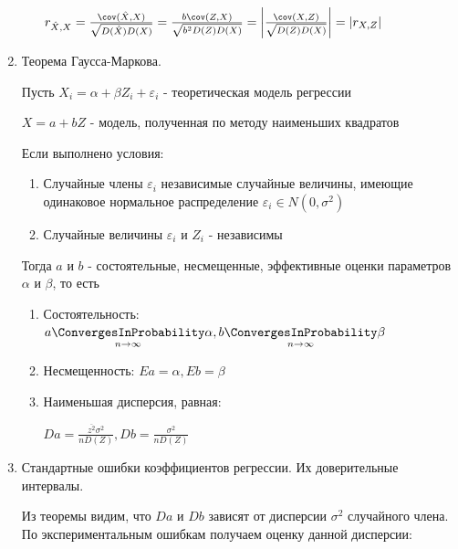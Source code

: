 \documentclass[12pt]{article}
\begin{document}
\begin{enumerate}
\begin{enumerate}
\begin{MyProof}
            $r_{\hat X, X} = \frac{\cov (\hat X, X)}{\sqrt{D(\hat X) D(X)}} = \frac{b \cov (Z, X)}{\sqrt{b^2 D(Z) D(X)}} = \left|\frac{\cov (X, Z)}{\sqrt{D(Z) D(X)}}\right| = |r_{X, Z}|$
        \end{MyProof}
    \end{enumerate}

    \item Теорема Гаусса-Маркова.

    \begin{MyTheorem}
         Пусть $X_i = \alpha + \beta Z_i + \varepsilon_i$ - теоретическая модель регрессии

        $X = a + b Z$ - модель, полученная по методу наименьших квадратов

        Если выполнено условия:

        \begin{enumerate}[label=\asbuk*),ref=\asbuk*]
            \item Случайные члены $\varepsilon_i$ независимые случайные величины, имеющие одинаковое нормальное распределение $\varepsilon_i \in N(0, \sigma^2)$
            \item Случайные величины $\varepsilon_i$ и $Z_i$ - независимы
        \end{enumerate}

        Тогда $a$ и $b$ - состоятельные, несмещенные, эффективные оценки параметров $\alpha$ и $\beta$, то есть

        \begin{enumerate}
            \item Состоятельность: $a \underset{n \to \infty}{\ConvergesInProbability} \alpha, b \underset{n \to \infty}{\ConvergesInProbability} \beta$
            \item Несмещенность: $Ea = \alpha, Eb = \beta$
            \item Наименьшая дисперсия, равная:

            $D a = \frac{\overline{z^2} \sigma^2}{n D(Z)}, Db = \frac{\sigma^2}{n D(Z)}$
        \end{enumerate}
    \end{MyTheorem}


    \item Стандартные ошибки коэффициентов регрессии. Их доверительные интервалы.

    Из теоремы видим, что $Da$ и $Db$ зависят от дисперсии $\sigma^2$ случайного члена. 
    По экспериментальным ошибкам получаем оценку данной дисперсии:


\end{enumerate}
\end{document}
